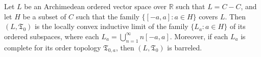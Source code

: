 Let $L$ be an Archimedean ordered vector space over $\mathbb{R}$ such that $L = C - C$, and let $H$ be a subset of $C$ such that the family $\{[-a, a] : a \in H\}$ covers $L$. Then $(L, \mathfrak{T}_0)$ is the locally convex inductive limit of the family $\{L_a : a \in H\}$ of its ordered subspaces, where each $L_a = \bigcup_{n=1}^{\infty} n[-a, a]$. Moreover, if each $L_a$ is complete for its order topology $\mathfrak{T}_{0,a}$, then $(L, \mathfrak{T}_0)$ is barreled.
